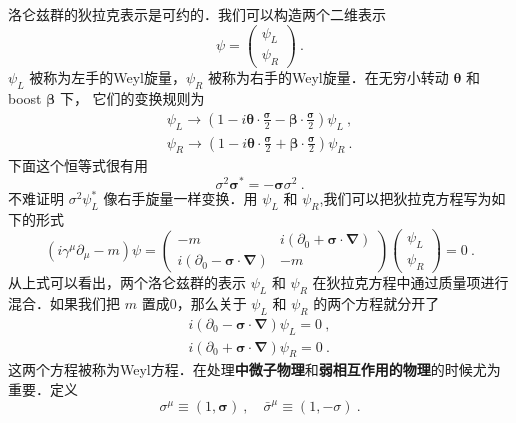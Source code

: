 
洛仑兹群的狄拉克表示是可约的．我们可以构造两个二维表示
\begin{equation}
\psi = \begin{pmatrix}
\psi_L \\
\psi_R
\end{pmatrix}~.
\end{equation}
$\psi_L$ 被称为左手的Weyl旋量，$\psi_R$ 被称为右手的Weyl旋量．在无穷小转动 $\mathbf \theta$ 和boost $\mathbf \beta$ 下， 它们的变换规则为
\begin{align}
\psi_L \rightarrow (1-i \boldsymbol \theta \cdot \frac{\boldsymbol \sigma}{2} - \boldsymbol \beta \cdot \frac{\boldsymbol \sigma}{2})\psi_L ~, \\
\psi_R \rightarrow (1-i\boldsymbol \theta \cdot \frac{\boldsymbol \sigma}{2}+ \boldsymbol \beta \cdot \frac{\boldsymbol \sigma}{2})\psi_R ~.
\end{align}
下面这个恒等式很有用
\begin{equation}
\sigma^2\boldsymbol \sigma^* = - \boldsymbol \sigma \sigma^2~.
\end{equation}
不难证明 $\sigma^2\psi^*_L$ 像右手旋量一样变换．用 $\psi_L$ 和 $\psi_R$,我们可以把狄拉克方程写为如下的形式
\begin{equation}
(i\gamma^\mu\partial_\mu - m)\psi = \begin{pmatrix}
- m & i (\partial_0+\boldsymbol \sigma \cdot \boldsymbol \nabla) \\
i(\partial_0-\boldsymbol\sigma\cdot \boldsymbol\nabla) & -m 
\end{pmatrix} \begin{pmatrix}
\psi_L \\ \psi_R 
\end{pmatrix}=0~.
\end{equation}
从上式可以看出，两个洛仑兹群的表示 $\psi_L$ 和 $\psi_R$ 在狄拉克方程中通过质量项进行混合．如果我们把 $m$ 置成0，那么关于 $\psi_L$ 和 $\psi_R$ 的两个方程就分开了
\begin{align}
i(\partial_0 - \boldsymbol \sigma \cdot \boldsymbol \nabla) \psi_L = 0~, \\
i(\partial_0 + \boldsymbol \sigma \cdot \boldsymbol \nabla) \psi_R = 0~. 
\end{align}
这两个方程被称为Weyl方程．在处理\textbf{中微子物理}和\textbf{弱相互作用的物理}的时候尤为重要．定义
\begin{equation}
\sigma^\mu \equiv (1,\boldsymbol \sigma)~, \quad \bar \sigma^\mu \equiv (1,-\sigma)~.
\end{equation}
